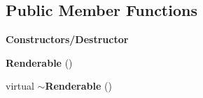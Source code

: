 \subsection*{Public Member Functions}
\begin{Indent}\textbf{ Constructors/\+Destructor}\par
\begin{DoxyCompactItemize}
\item 
\mbox{\label{classrev_1_1_renderable_a893230704f623b8fb835912392e86fb3}} 
{\bfseries Renderable} ()
\item 
\mbox{\label{classrev_1_1_renderable_acbe62bc185ba92be472f996dd08456c2}} 
virtual {\bfseries $\sim$\+Renderable} ()
\end{DoxyCompactItemize}
\end{Indent}
